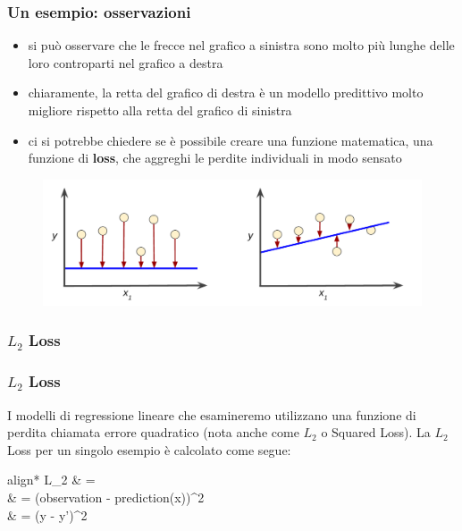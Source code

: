 \begin{frame}

	\frametitle{Un esempio: osservazioni}

		\begin{itemize}
			\item si può osservare che le frecce nel grafico a sinistra sono molto più lunghe delle loro controparti nel grafico a destra
			\item chiaramente, la retta del grafico di destra è un modello predittivo molto migliore rispetto alla retta del grafico di sinistra
			\item ci si potrebbe chiedere se è possibile creare una funzione matematica, una funzione di \textbf{loss}, che aggreghi le perdite individuali in modo sensato
		\end{itemize}

		\begin{figure}[!htbp]
			\centering
			\includegraphics[width=12cm]{images/supervised/training_loss_role/LossSideBySide.png}
		\end{figure}

\end{frame}


\subsubsection[$L_2$ Loss]{$L_2$ Loss}
\begin{frame}

	\frametitle{$L_2$ Loss}

	\begin{block}{}
		I modelli di regressione lineare che esamineremo utilizzano una funzione di perdita chiamata errore quadratico (nota anche come $L_2$ o Squared Loss).
		\newlinedouble
		La $L_2$ Loss per un singolo esempio è calcolato come segue:

		\begin{empheq}[box=\fcolorbox{blue!40!black!60}{yellow!10}]{align*}
		L_2 & = \\ & = (observation - prediction(x))^2 \\ & = (y - y')^2
		\end{empheq}

		\vspace{1mm}
	\end{block}

\end{frame}



